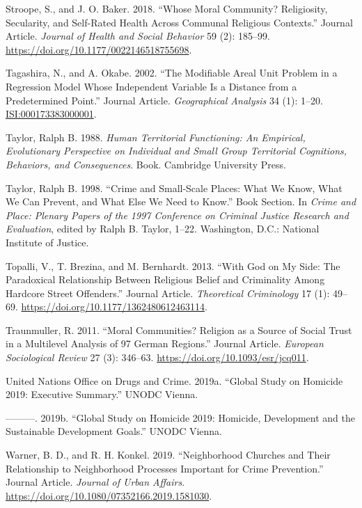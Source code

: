 \documentclass[smallextended]{svjour3}       %
\begin{document}
\leavevmode\hypertarget{ref-Stroope2018moral}{}%
Stroope, S., and J. O. Baker. 2018. ``Whose Moral Community?
Religiosity, Secularity, and Self-Rated Health Across Communal Religious
Contexts.'' Journal Article. \emph{Journal of Health and Social
Behavior} 59 (2): 185--99.
\url{https://doi.org/10.1177/0022146518755698}.

\leavevmode\hypertarget{ref-Tagashira2002modifiable}{}%
Tagashira, N., and A. Okabe. 2002. ``The Modifiable Areal Unit Problem
in a Regression Model Whose Independent Variable Is a Distance from a
Predetermined Point.'' Journal Article. \emph{Geographical Analysis} 34
(1): 1--20. \url{ISI:000173383000001}.

\leavevmode\hypertarget{ref-Taylor1988human}{}%
Taylor, Ralph B. 1988. \emph{Human Territorial Functioning: An
Empirical, Evolutionary Perspective on Individual and Small Group
Territorial Cognitions, Behaviors, and Consequences}. Book. Cambridge
University Press.

\leavevmode\hypertarget{ref-Taylor1998crime}{}%
Taylor, Ralph B. 1998. ``Crime and Small-Scale Places: What We Know,
What We Can Prevent, and What Else We Need to Know.'' Book Section. In
\emph{Crime and Place: Plenary Papers of the 1997 Conference on Criminal
Justice Research and Evaluation}, edited by Ralph B. Taylor, 1--22.
Washington, D.C.: National Institute of Justice.

\leavevmode\hypertarget{ref-Topalli2013god}{}%
Topalli, V., T. Brezina, and M. Bernhardt. 2013. ``With God on My Side:
The Paradoxical Relationship Between Religious Belief and Criminality
Among Hardcore Street Offenders.'' Journal Article. \emph{Theoretical
Criminology} 17 (1): 49--69.
\url{https://doi.org/10.1177/1362480612463114}.

\leavevmode\hypertarget{ref-Traunmuller2011moral}{}%
Traunmuller, R. 2011. ``Moral Communities? Religion as a Source of
Social Trust in a Multilevel Analysis of 97 German Regions.'' Journal
Article. \emph{European Sociological Review} 27 (3): 346--63.
\url{https://doi.org/10.1093/esr/jcq011}.

\leavevmode\hypertarget{ref-Unodc2019executive}{}%
United Nations Office on Drugs and Crime. 2019a. ``Global Study on
Homicide 2019: Executive Summary.'' UNODC Vienna.

\leavevmode\hypertarget{ref-Unodc2019development}{}%
---------. 2019b. ``Global Study on Homicide 2019: Homicide, Development
and the Sustainable Development Goals.'' UNODC Vienna.

\leavevmode\hypertarget{ref-Warner2019neighborhood}{}%
Warner, B. D., and R. H. Konkel. 2019. ``Neighborhood Churches and Their
Relationship to Neighborhood Processes Important for Crime Prevention.''
Journal Article. \emph{Journal of Urban Affairs}.
\url{https://doi.org/10.1080/07352166.2019.1581030}.
\end{document}
